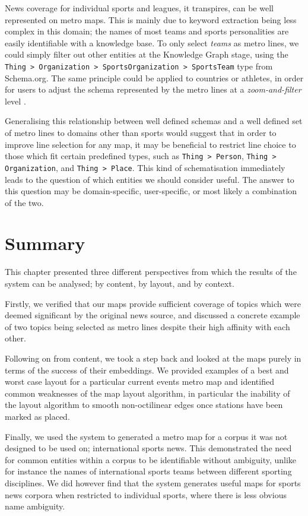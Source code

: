 News coverage for individual sports and leagues, it transpires, can be well represented on metro maps. This is mainly due to keyword extraction being less complex in this domain; the names of most teams and sports personalities are easily identifiable with a knowledge base. To only select \textit{teams} as metro lines, we could simply filter out other entities at the Knowledge Graph stage, using the \texttt{Thing > Organization > SportsOrganization > SportsTeam} type from Schema.org. The same principle could be applied to countries or athletes, in order for users to adjust the schema represented by the metro lines at a \textit{zoom-and-filter} level \citep{TheEyesHaveIt}.

Generalising this relationship between well defined schemas and a well defined set of metro lines to domains other than sports would suggest that in order to improve line selection for any map, it may be beneficial to restrict line choice to those which fit certain predefined types, such as \texttt{Thing > Person}, \texttt{Thing > Organization}, and \texttt{Thing > Place}. This kind of schematisation immediately leads to the question of which entities we should consider useful. The answer to this question may be domain-specific, user-specific, or most likely a combination of the two.

\section{Summary}

This chapter presented three different perspectives from which the results of the system can be analysed; by content, by layout, and by context. 

Firstly, we verified that our maps provide sufficient coverage of topics which were deemed significant by the original news source, and discussed a concrete example of two topics being selected as metro lines despite their high affinity with each other.

Following on from content, we took a step back and looked at the maps purely in terms of the success of their embeddings. We provided examples of a best and worst case layout for a particular current events metro map and identified common weaknesses of the map layout algorithm, in particular the inability of the layout algorithm to smooth non-octilinear edges once stations have been marked as placed.

Finally, we used the system to generated a metro map for a corpus it was not designed to be used on; international sports news. This demonstrated the need for common entities within a corpus to be identifiable without ambiguity, unlike for instance the names of international sports teams between different sporting disciplines. We did however find that the system generates useful maps for sports news corpora when restricted to individual sports, where there is less obvious name ambiguity.

